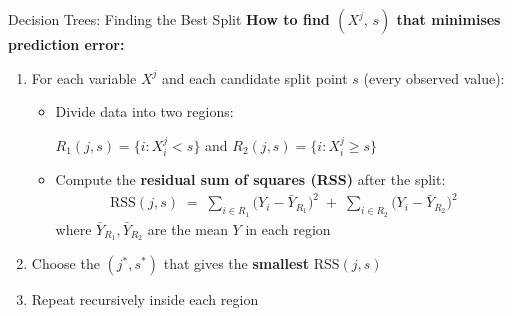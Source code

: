 \documentclass[hyperref={pdfpagelabels=false}]{beamer}
\begin{document}
\begin{frame}{Decision Trees: Finding the Best Split}
\textbf{How to find $(X^j,\, s)$ that minimises prediction error:}
\vspace{0.2cm}
\begin{enumerate}
  \item For each variable $X^j$ and each candidate split point $s$ (every observed value):
  \vspace{0.2cm}

  \begin{itemize}
    \item Divide data into two regions:
 

      $R_1(j,s) = \{i : X^j_i < s\}$ and $R_2(j,s) = \{i : X^j_i \geq s\}$
         \vspace{0.2cm}
    \item Compute the \textbf{residual sum of squares (RSS)} after the split:
    \begin{align*}
      \text{RSS}(j,s) \;=\;
      \sum_{i\in R_1}\!\bigl(Y_i - \bar{Y}_{R_1}\bigr)^2
      \;+\;
      \sum_{i\in R_2}\!\bigl(Y_i - \bar{Y}_{R_2}\bigr)^2
    \end{align*}
    where $\bar{Y}_{R_1},\bar{Y}_{R_2}$ are the mean $Y$ in each region\
    \vspace{0.2cm}

  \end{itemize}
  \item Choose the $(j^*, s^*)$ that gives the \textbf{smallest} $\text{RSS}(j,s)$
  \vspace{0.2cm}
  \item Repeat recursively inside each region
\end{enumerate}



\end{frame}
\end{document}
